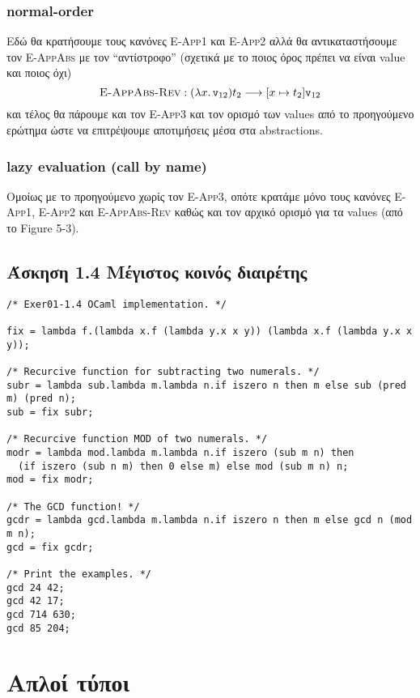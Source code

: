 \documentclass[a4paper,11pt]{article}
\newcommand\nlambda[1]{\ensuremath{\lambda #1.\,}}
\newcommand\nred{\ensuremath{\longrightarrow}}
\begin{document}
\subsubsection*{normal-order}
Εδώ θα κρατήσουμε τους κανόνες \textsc{E-App1} και \textsc{E-App2} αλλά θα αντικαταστήσουμε τον \textsc{E-AppAbs} με τον ``αντίστροφο'' (σχετικά με το ποιος όρος πρέπει να είναι value και ποιος όχι)
\[
  \textsc{E-AppAbs-Rev}: (\nlambda{x} \verb|v|_{12}) t_2 \nred [x \mapsto t_2] \verb|v|_{12}
\]
και τέλος θα πάρουμε και τον \textsc{E-App3} και τον ορισμό των values από το προηγούμενο ερώτημα ώστε να επιτρέψουμε αποτιμήσεις μέσα στα abstractions.

\subsubsection*{lazy evaluation (call by name)}
Ομοίως με το προηγούμενο χωρίς τον \textsc{E-App3}, οπότε κρατάμε μόνο τους κανόνες \textsc{E-App1}, \textsc{E-App2} και \textsc{E-AppAbs-Rev} καθώς και τον αρχικό ορισμό για τα values (από το Figure 5-3).


\subsection*{Άσκηση 1.4 Μέγιστος κοινός διαιρέτης}

\begin{verbatim}
/* Exer01-1.4 OCaml implementation. */

fix = lambda f.(lambda x.f (lambda y.x x y)) (lambda x.f (lambda y.x x y));

/* Recurcive function for subtracting two numerals. */
subr = lambda sub.lambda m.lambda n.if iszero n then m else sub (pred m) (pred n);
sub = fix subr;

/* Recurcive function MOD of two numerals. */
modr = lambda mod.lambda m.lambda n.if iszero (sub m n) then
  (if iszero (sub n m) then 0 else m) else mod (sub m n) n;
mod = fix modr;

/* The GCD function! */
gcdr = lambda gcd.lambda m.lambda n.if iszero n then m else gcd n (mod m n);
gcd = fix gcdr;

/* Print the examples. */
gcd 24 42;
gcd 42 17;
gcd 714 630;
gcd 85 204;
\end{verbatim}

\pagebreak

\section{Απλοί τύποι}
\end{document}
